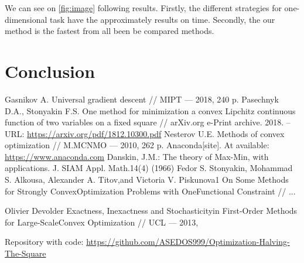 \documentclass[12pt]{article}
\begin{document}
We can see on \ref{fig:image} following results. Firstly, the different strategies for one-dimensional task have the approximately results on time. Secondly, the our method is the fastest from all been be compared methods.

\section{Conclusion}
\newpage
\begin{thebibliography}{3}
Gasnikov A.  Universal gradient descent // MIPT --- 2018, 240 p.
Pasechnyk D.A., Stonyakin F.S.  One method for minimization a convex Lipchitz continuous function of two variables on a fixed square // arXiv.org e-Print archive. 2018. – URL: \href{https://arxiv.org/pdf/1812.10300.pdf}{https://arxiv.org/pdf/1812.10300.pdf}
Nesterov U.E.  Methods of convex optimization // M.MCNMO --- 2010, 262 p.
Anaconda[site]. At available: \href{https://www.anaconda.com}{https://www.anaconda.com}
Danskin, J.M.: The theory of Max-Min, with applications. J. SIAM Appl. Math.14(4) (1966)
Fedor S. Stonyakin, Mohammad S. Alkousa, Alexander A. Titov,and Victoria V. Piskunova1 On Some Methods for Strongly ConvexOptimization Problems with OneFunctional Constraint // ...

Olivier Devolder Exactness, Inexactness and Stochasticityin First-Order Methods for Large-ScaleConvex Optimization // UCL --- 2013,

Repository with code: \href{https://github.com/ASEDOS999/Optimization-Halving-The-Square}{https://github.com/ASEDOS999/Optimization-Halving-The-Square}
\end{thebibliography}
\end{document}
